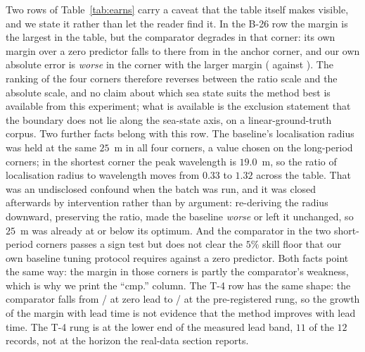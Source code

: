 \documentclass[review]{elsarticle}
\begin{document}
Two rows of Table~\ref{tab:earns} carry a caveat that the table itself makes
visible, and we state it rather than let the reader find it. In the B-26 row the
margin is the largest in the table, but the comparator degrades in that corner:
its own margin over a zero predictor falls to \BTwentySixCmpRel{} there from
\BTwentySixAnchorCmpRel{} in the anchor corner, and our own absolute error is
\emph{worse} in the corner with the larger margin (\BTwentySixAbs{} against
\BTwentySixAnchorAbs{}). The ranking of the four corners therefore reverses
between the ratio scale and the absolute scale, and no claim about which sea state
suits the method best is available from this experiment; what is available is the
exclusion statement that the boundary does not lie along the sea-state axis, on a
linear-ground-truth corpus.
Two further facts belong with this row. The baseline's localisation radius was held
at the same $25$~m in all four corners, a value chosen on the long-period corners;
in the shortest corner the peak wavelength is $19.0$~m, so the ratio of localisation
radius to wavelength moves from $0.33$ to $1.32$ across the table. That was an
undisclosed confound when the batch was run, and it was closed afterwards by
intervention rather than by argument: re-deriving the radius downward, preserving
the ratio, made the baseline \emph{worse} or left it unchanged, so $25$~m was
already at or below its optimum. And the comparator in the two short-period corners
passes a sign test but does not clear the $5\%$ skill floor that our own baseline
tuning protocol requires against a zero predictor. Both facts point the same way:
the margin in those corners is partly the comparator's weakness, which is why we
print the ``cmp.'' column. The T-4 row has the same shape: the comparator falls
from \TFourCmpAtZero{}/\TFourN{} at zero lead to \TFourCmp{}/\TFourN{} at the
pre-registered rung, so the growth of the margin with lead time is not evidence
that the method improves with lead time. The T-4 rung is at the lower end of the
measured lead band, $11$ of the $12$ records, not at the horizon the real-data
section reports. 
\end{document}
